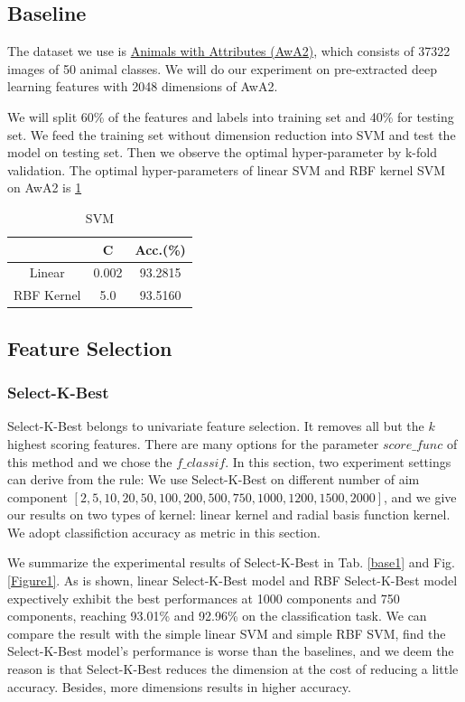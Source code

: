 \documentclass{article}
\begin{document}
\subsection{Baseline}
\par The dataset we use is \href{https://cvml.ist.ac.at/AwA2/}{Animals with Attributes (AwA2)}, which consists of 37322 images of 50 animal classes. We will do our experiment on pre-extracted deep learning features with 2048 dimensions of AwA2.
\par We will split 60\% of the features and labels into training set and 40\% for testing set.
We feed the training set without dimension reduction into SVM and test the model on testing set. Then we observe the optimal hyper-parameter by k-fold validation. The optimal hyper-parameters of linear SVM and RBF kernel SVM on AwA2 is \ref{baseline}
\begin{table}[htbp]
	\centering
	\newcommand{\tabincell}[2]{\begin{tabular}{@{}#1@{}}#2\end{tabular}}
	\renewcommand\arraystretch{1.0}
	\caption{SVM}
	\label{baseline}%
	\begin{tabular}{c|c|c}
		\hline
			& C & Acc.(\%)\\
		\hline
		Linear & 0.002 & 93.2815\\
		\hline
		RBF Kernel & 5.0 & 93.5160\\
		\hline
\end{tabular}
\end{table}
\subsection{Feature Selection}
\subsubsection{Select-K-Best}
Select-K-Best belongs to univariate feature selection. It removes all but the $k$ highest scoring features. There are many options for the parameter $score\_func$ of this method and we chose the $f\_classif$. In this section, two experiment settings can derive from the rule: We use Select-K-Best on different number of aim component $[2, 5, 10, 20, 50, 100, 200, 500, 750, 1000, 1200, 1500, 2000]$, and we give our results on two types of kernel: linear kernel and radial basis function kernel. We adopt classifiction accuracy as metric in this section.

We summarize the experimental results of Select-K-Best in Tab. \ref{base1} and Fig. \ref{Figure1}. As is shown, linear Select-K-Best model and RBF Select-K-Best model expectively exhibit the best performances at 1000 components and 750 components, reaching 93.01\% and 92.96\% on the classification task. We can compare the result with the simple linear SVM and simple RBF SVM, find the Select-K-Best model's performance is worse than the baselines, and we deem the reason is that Select-K-Best reduces the dimension at the cost of reducing a little accuracy. Besides, more dimensions results in higher accuracy.
\end{document}
